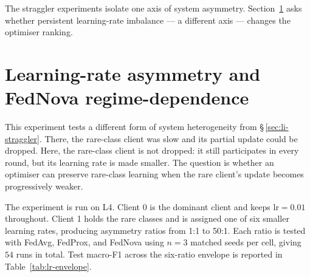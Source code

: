 \documentclass[11pt,a4paper]{report}
\begin{document}
The straggler experiments isolate one axis of system asymmetry.
Section~\ref{sec:lr-asymmetry} asks whether persistent learning-rate
imbalance --- a different axis --- changes the optimiser ranking.





\section{Learning-rate asymmetry and FedNova regime-dependence}
\label{sec:lr-asymmetry}

This experiment tests a different form of system heterogeneity from
\S\,\ref{sec:li-straggler}. There, the rare-class client was slow and its
partial update could be dropped. Here, the rare-class client is not dropped:
it still participates in every round, but its learning rate is made smaller.
The question is whether an optimiser can preserve rare-class learning when
the rare client's update becomes progressively weaker.

The experiment is run on L4. Client 0 is the dominant client and keeps
$\textrm{lr}=0.01$ throughout. Client 1 holds the rare classes and is assigned
one of six smaller learning rates, producing asymmetry ratios from 1:1 to
50:1. Each ratio is tested with FedAvg, FedProx, and FedNova using $n=3$
matched seeds per cell, giving $54$ runs in total. Test macro-F1 across the
six-ratio envelope is reported in Table~\ref{tab:lr-envelope}.
\end{document}
